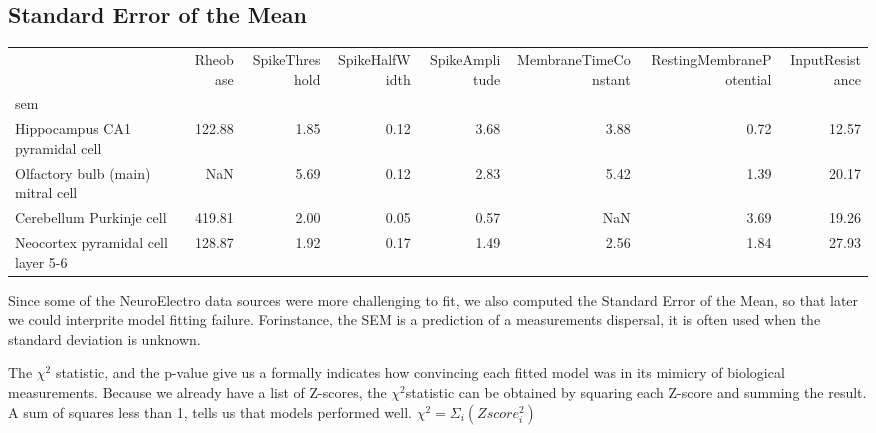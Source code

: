 \subsection{Standard Error of the Mean}
\begin{tabular}{lrrrrrrr}
\toprule
{} &  Rheobase &  SpikeThreshold &  SpikeHalfWidth &  SpikeAmplitude &  MembraneTimeConstant &  RestingMembranePotential &  InputResistance \\
sem                                &           &                 &                 &                 &                       &                           &                  \\
\midrule
Hippocampus CA1 pyramidal cell     &    122.88 &            1.85 &            0.12 &            3.68 &                  3.88 &                      0.72 &            12.57 \\
Olfactory bulb (main) mitral cell  &       NaN &            5.69 &            0.12 &            2.83 &                  5.42 &                      1.39 &            20.17 \\
Cerebellum Purkinje cell           &    419.81 &            2.00 &            0.05 &            0.57 &                   NaN &                      3.69 &            19.26 \\
Neocortex pyramidal cell layer 5-6 &    128.87 &            1.92 &            0.17 &            1.49 &                  2.56 &                      1.84 &            27.93 \\
\bottomrule
\end{tabular}


Since some of the NeuroElectro data sources were more challenging to fit, we also computed the Standard Error of the Mean, so that later we could interprite model fitting failure. Forinstance, the SEM is a prediction of a measurements dispersal, it is often used when the standard deviation is unknown. 

The $\chi^{2}$ statistic, and the p-value give us a formally indicates how convincing each fitted model was in its mimicry of biological measurements.
Because we already have a list of Z-scores, the $\chi^{2} $statistic can be obtained by squaring each Z-score and summing the result. A sum of squares less than 1, tells us that models performed well.
$\chi^{2}=\Sigma_{i} (Zscore_{i}^{2}) $


